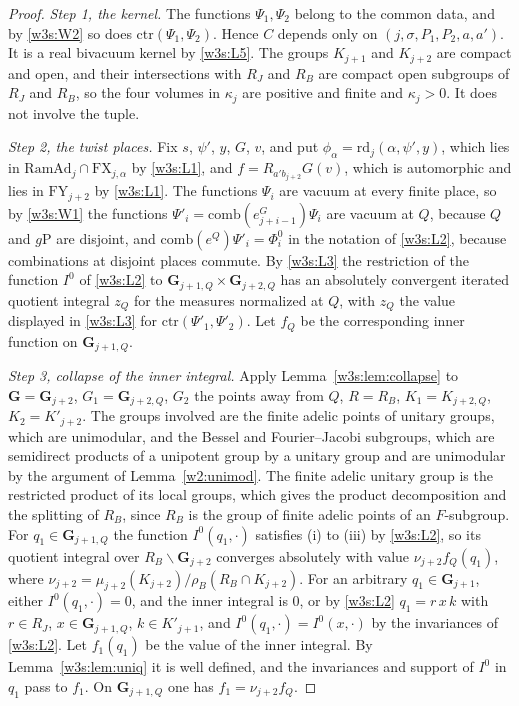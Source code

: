 \begin{proof}
\emph{Step 1, the kernel.} The functions $\Psi_1,\Psi_2$ belong to the common data, and by \ref{w3s:W2} so does $\mathrm{ctr}(\Psi_1,\Psi_2)$. Hence $C$ depends only on $(j,\sigma,P_1,P_2,a,a')$. It is a real bivacuum kernel by \ref{w3s:L5}. The groups $K_{j+1}$ and $K_{j+2}$ are compact and open, and their intersections with $R_J$ and $R_B$ are compact open subgroups of $R_J$ and $R_B$, so the four volumes in $\kappa_j$ are positive and finite and $\kappa_j>0$. It does not involve the tuple.

\emph{Step 2, the twist places.} Fix $s$, $\psi'$, $y$, $G$, $v$, and put $\phi_\alpha=\mathrm{rd}_j(\alpha,\psi',y)$, which lies in $\mathrm{RamAd}_j\cap\mathrm{FX}_{j,\alpha}$ by \ref{w3s:L1}, and $f=R_{a'b_{j+2}}G(v)$, which is automorphic and lies in $\mathrm{FY}_{j+2}$ by \ref{w3s:L1}. The functions $\Psi_i$ are vacuum at every finite place, so by \ref{w3s:W1} the functions $\Psi'_i=\mathrm{comb}(e^G_{j+i-1})\Psi_i$ are vacuum at $Q$, because $Q$ and $g\mathrm P$ are disjoint, and $\mathrm{comb}(e^Q)\Psi'_i=\Phi^0_i$ in the notation of \ref{w3s:L2}, because combinations at disjoint places commute. By \ref{w3s:L3} the restriction of the function $I^0$ of \ref{w3s:L2} to $\mathbf G_{j+1,Q}\times\mathbf G_{j+2,Q}$ has an absolutely convergent iterated quotient integral $z_Q$ for the measures normalized at $Q$, with $z_Q$ the value displayed in \ref{w3s:L3} for $\mathrm{ctr}(\Psi'_1,\Psi'_2)$. Let $f_Q$ be the corresponding inner function on $\mathbf G_{j+1,Q}$.

\emph{Step 3, collapse of the inner integral.} Apply Lemma~\ref{w3s:lem:collapse} to $\mathbf G=\mathbf G_{j+2}$, $G_1=\mathbf G_{j+2,Q}$, $G_2$ the points away from $Q$, $R=R_B$, $K_1=K_{j+2,Q}$, $K_2=K'_{j+2}$. The groups involved are the finite adelic points of unitary groups, which are unimodular, and the Bessel and Fourier--Jacobi subgroups, which are semidirect products of a unipotent group by a unitary group and are unimodular by the argument of Lemma~\ref{w2:unimod}. The finite adelic unitary group is the restricted product of its local groups, which gives the product decomposition and the splitting of $R_B$, since $R_B$ is the group of finite adelic points of an $F$-subgroup. For $q_1\in\mathbf G_{j+1,Q}$ the function $I^0(q_1,\cdot)$ satisfies (i) to (iii) by \ref{w3s:L2}, so its quotient integral over $R_B\backslash\mathbf G_{j+2}$ converges absolutely with value $\nu_{j+2}f_Q(q_1)$, where $\nu_{j+2}=\mu_{j+2}(K_{j+2})/\rho_B(R_B\cap K_{j+2})$. For an arbitrary $q_1\in\mathbf G_{j+1}$, either $I^0(q_1,\cdot)=0$, and the inner integral is $0$, or by \ref{w3s:L2} $q_1=r\,x\,k$ with $r\in R_J$, $x\in\mathbf G_{j+1,Q}$, $k\in K'_{j+1}$, and $I^0(q_1,\cdot)=I^0(x,\cdot)$ by the invariances of \ref{w3s:L2}. Let $f_1(q_1)$ be the value of the inner integral. By Lemma~\ref{w3s:lem:uniq} it is well defined, and the invariances and support of $I^0$ in $q_1$ pass to $f_1$. On $\mathbf G_{j+1,Q}$ one has $f_1=\nu_{j+2}f_Q$.


\end{proof}
